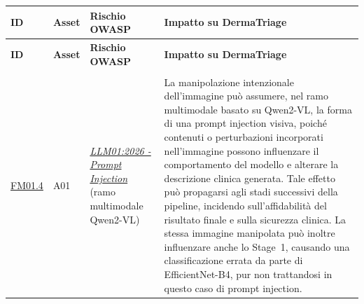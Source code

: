 

{
\small
{}
\setlength{\tabcolsep}{4pt}
\renewcommand{\arraystretch}{1.08}

\begin{xltabular}{\textwidth}{
    >{\raggedright\arraybackslash}p{1.1cm}
    >{\raggedright\arraybackslash}p{1.1cm}
    >{\raggedright\arraybackslash}p{4.3cm}
    X
}

\toprule

\textbf{ID} &
\textbf{Asset} &
\textbf{Rischio OWASP} &
\textbf{Impatto su DermaTriage} \\

\midrule

\endfirsthead

\toprule

\textbf{ID} &
\textbf{Asset} &
\textbf{Rischio OWASP} &
\textbf{Impatto su DermaTriage} \\

\midrule

\endhead

 \\
\endfoot

\endlastfoot


\hyperlink{fm01-4}{FM01.4} &

A01 &

\href{https://genai.owasp.org/resource/owasp-genai-llm-top-10-2026/}
{\textit{LLM01:2026 - Prompt Injection}}
(ramo multimodale Qwen2-VL) &

La manipolazione intenzionale dell'immagine può assumere, nel ramo multimodale
basato su Qwen2-VL, la forma di una prompt injection visiva, poiché contenuti o
perturbazioni incorporati nell'immagine possono influenzare il comportamento del
modello e alterare la descrizione clinica generata. Tale effetto può propagarsi
agli stadi successivi della pipeline, incidendo sull'affidabilità del risultato
finale e sulla sicurezza clinica. La stessa immagine manipolata può inoltre
influenzare anche lo Stage~1, causando una classificazione errata da parte di
EfficientNet-B4, pur non trattandosi in questo caso di prompt injection. \\


\end{xltabular}}

